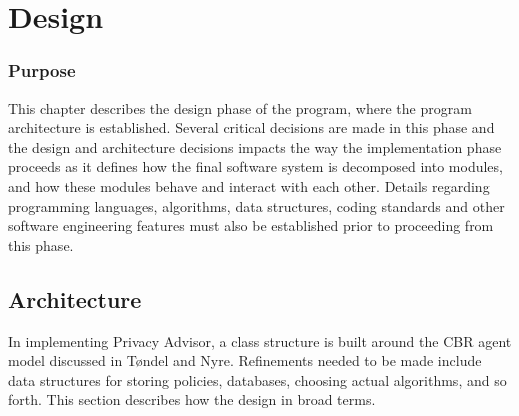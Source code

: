  

\chapter{Design}
\label{design}

\minitoc

\subsection*{Purpose}
This chapter describes the design phase of the program, where the program architecture is established. Several critical decisions are made in this phase and the design and architecture decisions impacts the way the implementation phase proceeds as it defines how the final software system is decomposed into modules, and how these modules behave and interact with each other. Details regarding programming languages, algorithms, data structures, coding standards and other software engineering features must also be established prior to proceeding from this phase.



\section{Architecture}
In implementing Privacy Advisor, a class structure is built around the CBR agent model discussed in T{\o}ndel and Nyre. Refinements needed to be made include data structures for storing policies, databases, choosing actual algorithms, and so forth. This section describes how the design in broad terms.

